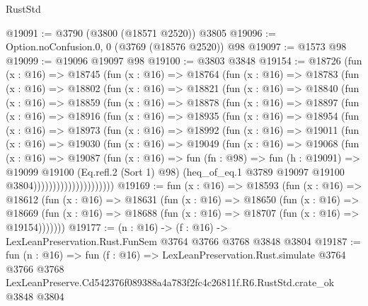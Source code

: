 \begin{lexlean}{RustStd}
\begin{coremodule}
@19091 := @3790 (@3800 (@18571 @2520)) @3805
@19096 := Option.noConfusion.{0, 0} (@3769 (@18576 @2520)) @98
@19097 := @1573 @98
@19099 := @19096 @19097 @98
@19100 := @3803 @3848
@19154 := @18726
    (fun (x : @16) =>
    @18745
      (fun (x : @16) =>
      @18764
        (fun (x : @16) =>
        @18783
          (fun (x : @16) =>
          @18802
            (fun (x : @16) =>
            @18821
              (fun (x : @16) =>
              @18840
                (fun (x : @16) =>
                @18859
                  (fun (x : @16) =>
                  @18878
                    (fun (x : @16) =>
                    @18897
                      (fun (x : @16) =>
                      @18916
                        (fun (x : @16) =>
                        @18935
                          (fun (x : @16) =>
                          @18954
                            (fun (x : @16) =>
                            @18973
                              (fun (x : @16) =>
                              @18992
                                (fun (x : @16) =>
                                @19011
                                  (fun (x : @16) =>
                                  @19030
                                    (fun (x : @16) =>
                                    @19049
                                      (fun (x : @16) =>
                                      @19068
                                        (fun (x : @16) =>
                                        @19087
                                          (fun (x : @16) =>
                                          fun (fn : @98) =>
                                          fun (h : @19091) =>
                                          @19099
                                            @19100
                                            (Eq.refl.{2} (Sort 1) @98)
                                            (heq_of_eq.{1}
                                              @3789
                                              @19097
                                              @19100
                                              @3804)))))))))))))))))))))
@19169 := fun (x : @16) =>
  @18593
    (fun (x : @16) =>
    @18612
      (fun (x : @16) =>
      @18631
        (fun (x : @16) =>
        @18650
          (fun (x : @16) =>
          @18669 (fun (x : @16) => @18688 (fun (x : @16) => @18707 (fun (x : @16) => @19154)))))))
@19177 := (n : @16) -> (f : @16) -> LexLeanPreservation.Rust.FunSem @3764 @3766 @3768 @3848 @3804
@19187 := fun (n : @16) =>
  fun (f : @16) =>
  LexLeanPreservation.Rust.simulate
    @3764
    @3766
    @3768
    LexLeanPreserve.Cd542376f089388a4a783f2fc4c26811f.R6.RustStd.crate_ok
    @3848
    @3804
\end{coremodule}
\end{lexlean}
